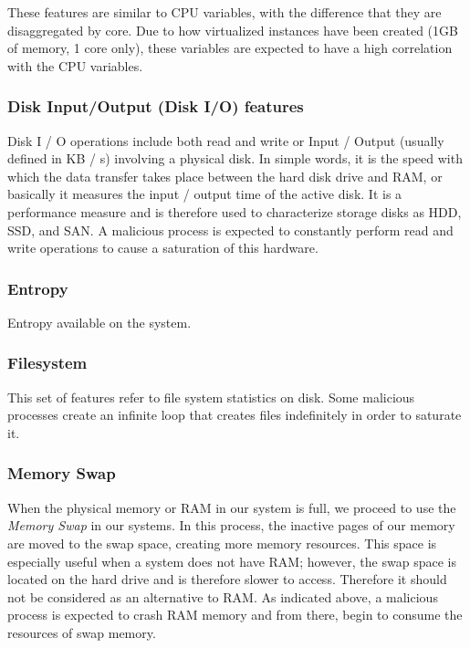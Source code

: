 \documentclass{iosart2c}
\begin{document}
These features are similar to CPU variables, with the difference that they are disaggregated by core. Due to how virtualized instances have been created (1GB of memory, 1 core only), these variables are expected to have a high correlation with the CPU variables.


\subsubsection{Disk Input/Output (Disk I/O) features}

Disk I / O operations include both read and write or Input / Output (usually defined in KB / s) involving a physical disk. In simple words, it is the speed with which the data transfer takes place between the hard disk drive and RAM, or basically it measures the input / output time of the active disk. It is a performance measure and is therefore used to characterize storage disks as HDD, SSD, and SAN. A malicious process is expected to constantly perform read and write operations to cause a saturation of this hardware. \\

\subsubsection{Entropy}
Entropy available on the system.

\subsubsection{Filesystem}

This set of features refer to file system statistics on disk. Some malicious processes create an infinite loop that creates files indefinitely in order to saturate it. \\

\subsubsection{Memory Swap}

When the physical memory or RAM in our system is full, we proceed to use the \textit{Memory Swap} in our systems. In this process, the inactive pages of our memory are moved to the swap space, creating more memory resources. This space is especially useful when a system does not have RAM; however, the swap space is located on the hard drive and is therefore slower to access. Therefore it should not be considered as an alternative to RAM. As indicated above, a malicious process is expected to crash RAM memory and from there, begin to consume the resources of swap memory.
\end{document}
